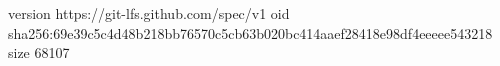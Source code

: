 version https://git-lfs.github.com/spec/v1
oid sha256:69e39c5c4d48b218bb76570c5cb63b020bc414aaef28418e98df4eeeee543218
size 68107
